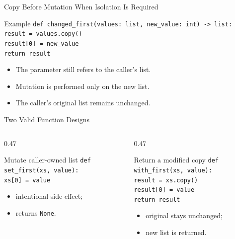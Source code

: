 \documentclass[aspectratio=169,10pt]{beamer}
\begin{document}
\begin{frame}{Copy Before Mutation When Isolation Is Required}
  \begin{block}{Example}
    \texttt{def changed\_first(values: list, new\_value: int) -> list:}\\
    \hspace{0.18in}\texttt{result = values.copy()}\\
    \hspace{0.18in}\texttt{result[0] = new\_value}\\
    \hspace{0.18in}\texttt{return result}
  \end{block}

  \begin{itemize}
    \item The parameter still refers to the caller's list.
    \item Mutation is performed only on the new list.
    \item The caller's original list remains unchanged.
  \end{itemize}
\end{frame}

\begin{frame}{Two Valid Function Designs}
  \begin{columns}[T,onlytextwidth]
    \begin{column}{0.47\textwidth}
      \begin{block}{Mutate caller-owned list}
        \texttt{def set\_first(xs, value):}\\
        \hspace{0.14in}\texttt{xs[0] = value}
      \end{block}
      \begin{itemize}
        \item intentional side effect;
        \item returns \texttt{None}.
      \end{itemize}
    \end{column}
    \begin{column}{0.47\textwidth}
      \begin{block}{Return a modified copy}
        \texttt{def with\_first(xs, value):}\\
        \hspace{0.14in}\texttt{result = xs.copy()}\\
        \hspace{0.14in}\texttt{result[0] = value}\\
        \hspace{0.14in}\texttt{return result}
      \end{block}
      \begin{itemize}
        \item original stays unchanged;
        \item new list is returned.
      \end{itemize}
    \end{column}
  \end{columns}
\end{frame}
\end{document}
